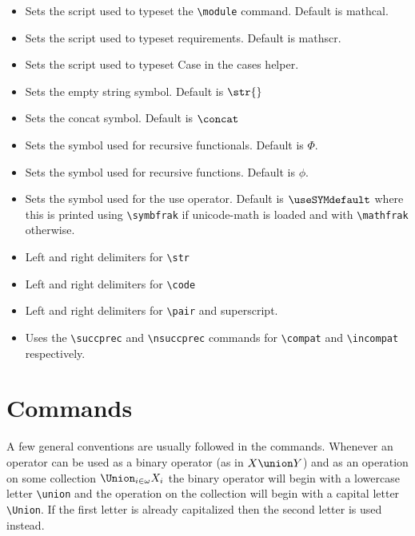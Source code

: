 \documentclass[leqno,11pt]{amsart}
\begin{document}
\begin{itemize}
	\item[modulescr] Sets the script used to typeset the \verb=\module= command.  Default is mathcal.
	\item[reqscr] Sets the script used to typeset requirements.  Default is mathscr.
	\item[pfcasefont] Sets the script used to typeset Case in the cases helper.
	\item[emptystr] Sets the empty string symbol.  Default is \( \str{} \) 
	\item[concatsym] Sets the concat symbol.  Default is \( \concat \) 
	\item[recfnlsym] Sets the symbol used for recursive functionals.  Default is \( \Phi \).
	\item[recfsym]  Sets the symbol used for recursive functions.  Default is \( \phi \).
	\item[usesym]  Sets the symbol used for the use operator.  Default is \( \useSYMdefault \) where this is printed using \verb=\symbfrak= if unicode-math is loaded and with \verb=\mathfrak= otherwise.
	\item[lstrdelim,rstrdelim] Left and right delimiters for \verb=\str=
	\item[lcodedelim,rcodedelim] Left and right delimiters for \verb=\code=
	\item[lpairdelim,rpairlim,pairsup] Left and right delimiters for \verb=\pair= and superscript.
	\item[altcompat] Uses the \verb=\succprec= and \verb=\nsuccprec= commands for \verb=\compat= and \verb=\incompat= respectively.

\end{itemize}





\section{Commands}
A few general conventions are usually followed in the commands.  Whenever an operator can be used as a binary operator (as in \( X \union Y \)) and as an operation on some collection \( \Union_{i \in \omega} X_i \) the binary operator will begin with a lowercase letter \verb=\union= and the operation on the collection will begin with a capital letter \verb=\Union=.  If the first letter is already capitalized then the second letter is used instead.
\end{document}
